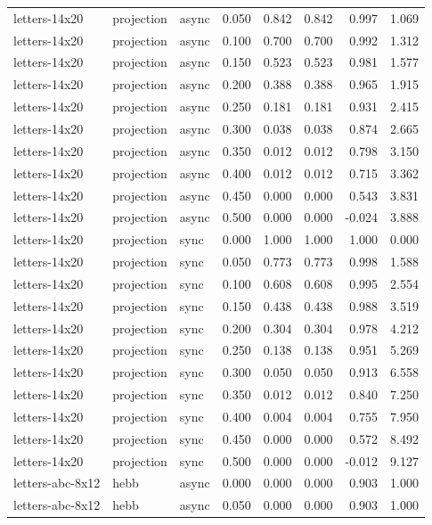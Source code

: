 \begin{tabular}{lllrrrrr}
letters-14x20 & projection & async & 0.050 & 0.842 & 0.842 & 0.997 & 1.069 \\
letters-14x20 & projection & async & 0.100 & 0.700 & 0.700 & 0.992 & 1.312 \\
letters-14x20 & projection & async & 0.150 & 0.523 & 0.523 & 0.981 & 1.577 \\
letters-14x20 & projection & async & 0.200 & 0.388 & 0.388 & 0.965 & 1.915 \\
letters-14x20 & projection & async & 0.250 & 0.181 & 0.181 & 0.931 & 2.415 \\
letters-14x20 & projection & async & 0.300 & 0.038 & 0.038 & 0.874 & 2.665 \\
letters-14x20 & projection & async & 0.350 & 0.012 & 0.012 & 0.798 & 3.150 \\
letters-14x20 & projection & async & 0.400 & 0.012 & 0.012 & 0.715 & 3.362 \\
letters-14x20 & projection & async & 0.450 & 0.000 & 0.000 & 0.543 & 3.831 \\
letters-14x20 & projection & async & 0.500 & 0.000 & 0.000 & -0.024 & 3.888 \\
letters-14x20 & projection & sync & 0.000 & 1.000 & 1.000 & 1.000 & 0.000 \\
letters-14x20 & projection & sync & 0.050 & 0.773 & 0.773 & 0.998 & 1.588 \\
letters-14x20 & projection & sync & 0.100 & 0.608 & 0.608 & 0.995 & 2.554 \\
letters-14x20 & projection & sync & 0.150 & 0.438 & 0.438 & 0.988 & 3.519 \\
letters-14x20 & projection & sync & 0.200 & 0.304 & 0.304 & 0.978 & 4.212 \\
letters-14x20 & projection & sync & 0.250 & 0.138 & 0.138 & 0.951 & 5.269 \\
letters-14x20 & projection & sync & 0.300 & 0.050 & 0.050 & 0.913 & 6.558 \\
letters-14x20 & projection & sync & 0.350 & 0.012 & 0.012 & 0.840 & 7.250 \\
letters-14x20 & projection & sync & 0.400 & 0.004 & 0.004 & 0.755 & 7.950 \\
letters-14x20 & projection & sync & 0.450 & 0.000 & 0.000 & 0.572 & 8.492 \\
letters-14x20 & projection & sync & 0.500 & 0.000 & 0.000 & -0.012 & 9.127 \\
letters-abc-8x12 & hebb & async & 0.000 & 0.000 & 0.000 & 0.903 & 1.000 \\
letters-abc-8x12 & hebb & async & 0.050 & 0.000 & 0.000 & 0.903 & 1.000 \\

\end{tabular}
